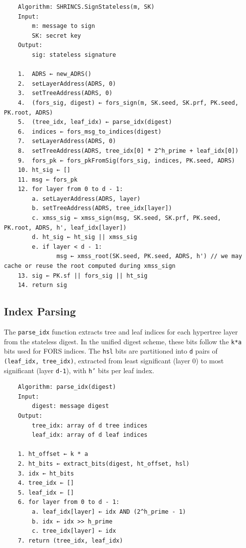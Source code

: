 \begin{verbatim}
    Algorithm: SHRINCS.SignStateless(m, SK)
    Input:
        m: message to sign
        SK: secret key
    Output:
        sig: stateless signature

    1.  ADRS ← new_ADRS()
    2.  setLayerAddress(ADRS, 0)
    3.  setTreeAddress(ADRS, 0)
    4.  (fors_sig, digest) ← fors_sign(m, SK.seed, SK.prf, PK.seed, PK.root, ADRS)
    5.  (tree_idx, leaf_idx) ← parse_idx(digest)
    6.  indices ← fors_msg_to_indices(digest)
    7.  setLayerAddress(ADRS, 0)
    8.  setTreeAddress(ADRS, tree_idx[0] * 2^h_prime + leaf_idx[0])
    9.  fors_pk ← fors_pkFromSig(fors_sig, indices, PK.seed, ADRS)
    10. ht_sig ← []
    11. msg ← fors_pk
    12. for layer from 0 to d - 1:
        a. setLayerAddress(ADRS, layer)
        b. setTreeAddress(ADRS, tree_idx[layer])
        c. xmss_sig ← xmss_sign(msg, SK.seed, SK.prf, PK.seed, PK.root, ADRS, h', leaf_idx[layer])
        d. ht_sig ← ht_sig || xmss_sig
        e. if layer < d - 1:
               msg ← xmss_root(SK.seed, PK.seed, ADRS, h') // we may cache or reuse the root computed during xmss_sign 
    13. sig ← PK.sf || fors_sig || ht_sig
    14. return sig
\end{verbatim}

\subsection{Index Parsing}
The \texttt{parse\_idx} function extracts tree and leaf indices for each hypertree layer from the stateless digest. In the unified digest scheme, these bits follow the \texttt{k*a} bits used for FORS indices. The \texttt{hsl} bits are partitioned into \texttt{d} pairs of \texttt{(leaf\_idx, tree\_idx)}, extracted from least significant (layer 0) to most significant (layer \texttt{d-1}), with \texttt{h'} bits per leaf index.
\begin{verbatim}
    Algorithm: parse_idx(digest)
    Input:
        digest: message digest
    Output:
        tree_idx: array of d tree indices
        leaf_idx: array of d leaf indices

    1. ht_offset ← k * a
    2. ht_bits ← extract_bits(digest, ht_offset, hsl)
    3. idx ← ht_bits
    4. tree_idx ← []
    5. leaf_idx ← []
    6. for layer from 0 to d - 1:
        a. leaf_idx[layer] ← idx AND (2^h_prime - 1)
        b. idx ← idx >> h_prime
        c. tree_idx[layer] ← idx
    7. return (tree_idx, leaf_idx)
\end{verbatim}
